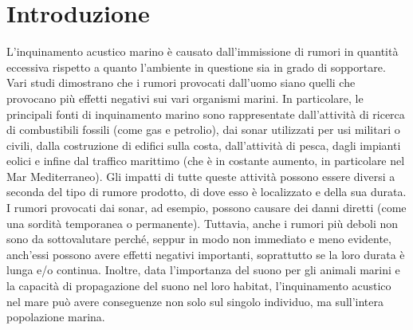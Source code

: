 
\chapter*{Introduzione}
L’inquinamento acustico marino è causato dall’immissione di rumori in quantità eccessiva rispetto a quanto l’ambiente in questione sia in grado di sopportare. Vari studi dimostrano che i rumori provocati dall’uomo siano quelli che provocano più effetti negativi sui vari organismi marini. In particolare, le principali fonti di inquinamento marino sono rappresentate dall’attività di ricerca di combustibili fossili (come gas e petrolio), dai sonar utilizzati per usi militari o civili, dalla costruzione di edifici sulla costa, dall’attività di pesca, dagli impianti eolici e infine dal traffico marittimo (che è in costante aumento, in particolare nel Mar Mediterraneo).
Gli impatti di tutte queste attività possono essere diversi a seconda del tipo di rumore prodotto, di dove esso è localizzato e della sua durata. I rumori provocati dai sonar, ad esempio, possono causare dei danni diretti (come una sordità temporanea o permanente). Tuttavia, anche i rumori più deboli non sono da sottovalutare perché, seppur in modo non immediato e meno evidente, anch’essi possono avere effetti negativi importanti, soprattutto se la loro durata è lunga e/o continua. Inoltre, data l’importanza del suono per gli animali marini e la capacità di propagazione del suono nel loro habitat, l’inquinamento acustico nel mare può avere conseguenze non solo sul singolo individuo, ma sull’intera popolazione marina.



